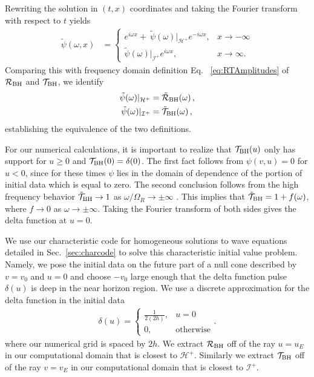 \begin{refsection}
Rewriting the solution in $(t,x)$ coordinates and taking the Fourier transform with respect to $t$ yields
\begin{align}
\tilde \psi(\omega,x)
&=\begin{cases}
e^{i\omega x}+\ \tilde \psi(\omega) |_{\mathcal{H}^+}e^{-i\omega x}, & x \to -\infty \\ \tilde \psi(\omega) |_{\mathcal{I}^+}e^{i\omega x}, & x \to \infty.
\end{cases}
\end{align}
Comparing this with frequency domain definition Eq. ~\eqref{eq:RTAmplitudes} of $\mathcal R_{\rm BH}$ and $\mathcal T_{\rm BH}$, we identify 
\begin{align}
\tilde \psi(\omega)|_{\mathcal{H}^+} &= \tilde{\mathcal R}_{\rm BH}(\omega) \,, \\ \tilde \psi(\omega)|_{\mathcal{I}^+} &= \tilde{\mathcal T}_{\rm BH}(\omega) \,,
\end{align}
establishing the equivalence of the two definitions.

For our numerical calculations, it is important to realize that $\mathcal T_{\rm BH}(u)$ only has support for $u\geq 0$ and $\mathcal T_{\rm BH}(0)=\delta(0)$. The first fact follows from $\psi(v,u)=0$ for $u<0$, since for these times $\psi$ lies in the domain of dependence of the portion of initial data which is equal to zero. 
The second conclusion follows from the high frequency behavior $\tilde{\mathcal T}_{\rm BH}\to 1$ as $\omega/\Omega_R \to \pm\infty$ \cite{Caponthesis}. This implies that $\tilde{\mathcal T}_{\rm BH} = 1 + f(\omega)$, where $f\to 0$ as $\omega \to \pm \infty$. Taking the Fourier transform of both sides gives the delta function at $u=0$. 

We use our characteristic code for homogeneous solutions to wave equations detailed in Sec.~\ref{sec:charcode} to solve this characteristic initial value problem.
Namely, we pose the initial data on the future part of a null cone described by $v=v_0$ and $u=0$ and choose $-v_0$ large enough that the delta function pulse $\delta(u)$ is deep in the near horizon region. 
We use a discrete approximation for the delta function in the initial data  
\begin{align}
\delta(u) =\begin{cases}
\displaystyle
\frac{1}{2(2h)}, & u =0 \\
0, & \text{otherwise}
\end{cases}.
\end{align}
where our numerical grid is spaced by $2h$.
We extract $\mathcal R_{\rm BH}$ off of the ray $u=u_E$ in our computational domain that is closest to $\mathcal{H}^+$. 
Similarly we extract $\mathcal T_{\rm BH}$ off of the ray $v=v_E$ in our computational domain that is closest to $\mathcal{I}^+$.


\end{refsection}
